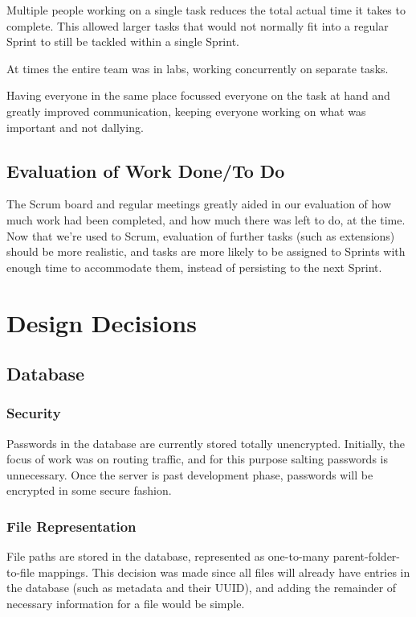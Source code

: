 \documentclass{article}
\begin{document}
Multiple people working on a single task reduces the total actual time it takes to
complete. This allowed larger tasks that would not normally fit into a regular Sprint
to still be tackled within a single Sprint.

At times the entire team was in labs, working concurrently on separate tasks.

Having everyone in the same place focussed everyone on the task at hand and greatly
improved communication, keeping everyone working on what was important and not dallying.

\subsection{Evaluation of Work Done/To Do}
The Scrum board and regular meetings greatly aided in our evaluation of how much work
had been completed, and how much there was left to do, at the time. Now that we're
used to Scrum, evaluation of further tasks (such as extensions) should be more
realistic, and tasks are more likely to be assigned to Sprints with enough time to
accommodate them, instead of persisting to the next Sprint.

\section{Design Decisions}
\subsection{Database}
\subsubsection{Security}
Passwords in the database are currently stored totally unencrypted. Initially,
the focus of work was on routing traffic, and for this purpose salting
passwords is unnecessary. Once the server is past development phase, passwords
will be encrypted in some secure fashion.

\subsubsection{File Representation}
File paths are stored in the database, represented as one-to-many parent-folder-to-file
mappings. This decision was made since all files will already have entries in the
database (such as metadata and their UUID), and adding the remainder of necessary
information for a file would be simple.
\end{document}
